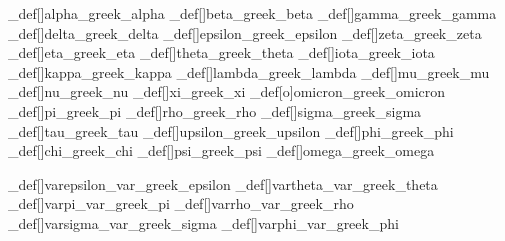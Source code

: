 \brl@char_def[]{alpha}{\brl@char@alias_greek\brl@char@alias_alpha}
\brl@char_def[]{beta}{\brl@char@alias_greek\brl@char@alias_beta}
\brl@char_def[]{gamma}{\brl@char@alias_greek\brl@char@alias_gamma}
\brl@char_def[]{delta}{\brl@char@alias_greek\brl@char@alias_delta}
\brl@char_def[]{epsilon}{\brl@char@alias_greek\brl@char@alias_epsilon}
\brl@char_def[]{zeta}{\brl@char@alias_greek\brl@char@alias_zeta}
\brl@char_def[]{eta}{\brl@char@alias_greek\brl@char@alias_eta}
\brl@char_def[]{theta}{\brl@char@alias_greek\brl@char@alias_theta}
\brl@char_def[]{iota}{\brl@char@alias_greek\brl@char@alias_iota}
\brl@char_def[]{kappa}{\brl@char@alias_greek\brl@char@alias_kappa}
\brl@char_def[]{lambda}{\brl@char@alias_greek\brl@char@alias_lambda}
\brl@char_def[]{mu}{\brl@char@alias_greek\brl@char@alias_mu}
\brl@char_def[]{nu}{\brl@char@alias_greek\brl@char@alias_nu}
\brl@char_def[]{xi}{\brl@char@alias_greek\brl@char@alias_xi}
\brl@char_def[o]{omicron}{\brl@char@alias_greek\brl@char@alias_omicron}
\brl@char_def[]{pi}{\brl@char@alias_greek\brl@char@alias_pi}
\brl@char_def[]{rho}{\brl@char@alias_greek\brl@char@alias_rho}
\brl@char_def[]{sigma}{\brl@char@alias_greek\brl@char@alias_sigma}
\brl@char_def[]{tau}{\brl@char@alias_greek\brl@char@alias_tau}
\brl@char_def[]{upsilon}{\brl@char@alias_greek\brl@char@alias_upsilon}
\brl@char_def[]{phi}{\brl@char@alias_greek\brl@char@alias_phi}
\brl@char_def[]{chi}{\brl@char@alias_greek\brl@char@alias_chi}
\brl@char_def[]{psi}{\brl@char@alias_greek\brl@char@alias_psi}
\brl@char_def[]{omega}{\brl@char@alias_greek\brl@char@alias_omega}

\brl@char_def[]{varepsilon}{\brl@char@alias_var\brl@char@alias_greek\brl@char@alias_epsilon}
\brl@char_def[]{vartheta}{\brl@char@alias_var\brl@char@alias_greek\brl@char@alias_theta}
\brl@char_def[]{varpi}{\brl@char@alias_var\brl@char@alias_greek\brl@char@alias_pi}
\brl@char_def[]{varrho}{\brl@char@alias_var\brl@char@alias_greek\brl@char@alias_rho}
\brl@char_def[]{varsigma}{\brl@char@alias_var\brl@char@alias_greek\brl@char@alias_sigma}
\brl@char_def[]{varphi}{\brl@char@alias_var\brl@char@alias_greek\brl@char@alias_phi}



